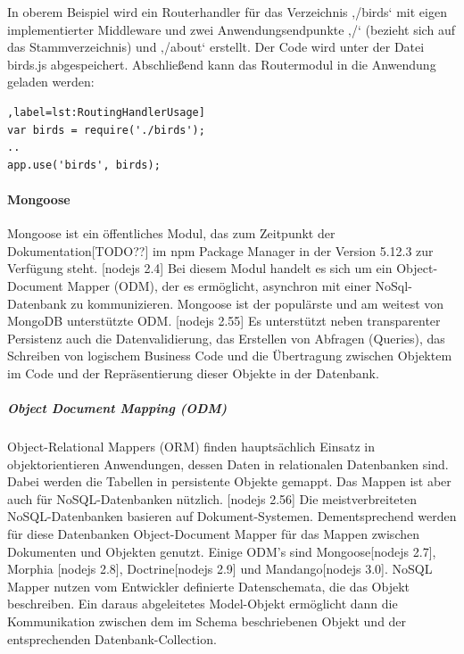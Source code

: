 
\noindent
In oberem Beispiel wird ein Routerhandler für das Verzeichnis ‚/birds‘ mit eigen implementierter Middleware und zwei Anwendungsendpunkte ‚/‘ (bezieht sich auf das Stammverzeichnis) und ‚/about‘ erstellt. Der Code wird unter der Datei birds.js abgespeichert. 
Abschließend kann das Routermodul in die Anwendung geladen werden: 
\newline

\begin{lstlisting}[caption=Routinghandler benutzen[nodejs 2.2],label=lst:RoutingHandlerUsage]
var birds = require('./birds');
..
app.use('birds', birds);
\end{lstlisting}


\newpage
\paragraph{Mongoose}
Mongoose ist ein öffentliches Modul, das zum Zeitpunkt der Dokumentation[TODO??] im npm Package Manager in der Version 5.12.3 zur Verfügung steht. [nodejs 2.4] Bei diesem Modul handelt es sich um ein Object-Document Mapper (ODM), der es ermöglicht, asynchron mit einer NoSql-Datenbank zu kommunizieren. Mongoose ist der populärste und am weitest von MongoDB unterstützte ODM. [nodejs 2.55] Es unterstützt neben transparenter Persistenz auch die Datenvalidierung, das Erstellen von Abfragen (Queries), das Schreiben von logischem Business Code und die Übertragung zwischen Objektem im Code und der Repräsentierung dieser Objekte in der Datenbank.
\newline

\subparagraph{Object Document Mapping (ODM)}
Object-Relational Mappers (ORM) finden haupt\-sächlich Einsatz in objektorientieren Anwendungen, dessen Daten in relationalen Datenbanken sind. Dabei werden die Tabellen in persistente Objekte gemappt.
Das Mappen ist aber auch für NoSQL-Datenbanken nützlich. [nodejs 2.56] Die meistverbreiteten NoSQL-Datenbanken basieren auf Dokument-Systemen. Dementsprechend werden für diese Datenbanken Object-Document Mapper für das Mappen zwischen Dokumenten und Objekten genutzt. Einige ODM’s sind Mongoose[nodejs 2.7], Morphia [nodejs 2.8], Doctrine[nodejs 2.9] und Mandango[nodejs 3.0].
NoSQL Mapper nutzen vom Entwickler definierte Datenschemata, die das Objekt beschreiben. Ein daraus abgeleitetes Model-Objekt ermöglicht dann die Kommunikation zwischen dem im Schema beschriebenen Objekt und der entsprechenden Datenbank-Collection.
\newline

